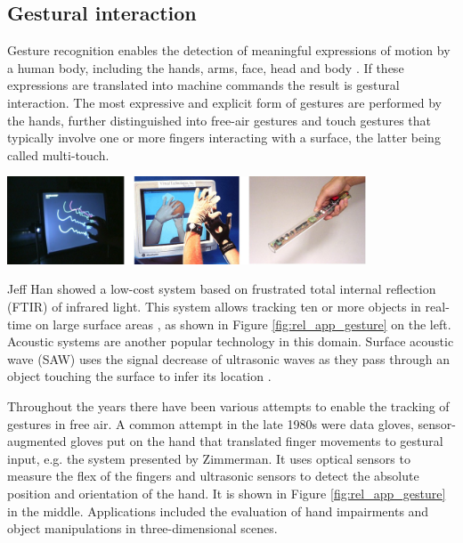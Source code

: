 \subsection{Gestural interaction}
Gesture recognition enables the detection of meaningful expressions of motion by a human body, including the hands, arms, face, head and body \cite{mitra2007gesture}	. If these expressions are translated into machine commands the result is gestural interaction. The most expressive and explicit form of gestures are performed by the hands, further distinguished into free-air gestures and touch gestures that typically involve one or more fingers interacting with a surface, the latter being called multi-touch.

\begin{minipage}{\linewidth}
\centering
\includegraphics[width=0.8\textwidth]{images/rel_app_gesture}
\label{fig:rel_app_gesture}
\end{minipage}

Jeff Han showed a low-cost system based on frustrated total internal reflection (FTIR) of infrared light. This system allows tracking ten or more objects in real-time on large surface areas \cite{Han2005}, as shown in Figure \ref{fig:rel_app_gesture} on the left. Acoustic systems are another popular technology in this domain. Surface acoustic wave (SAW) uses the signal decrease of ultrasonic waves as they pass through an object touching the surface to infer its location \cite{Armstrong1998}.
  
Throughout the years there have been various attempts to enable the tracking of gestures in free air. A common attempt in the late 1980s were data gloves, sensor-augmented gloves put on the hand that translated finger movements to gestural input, e.g. the system presented by Zimmerman\cite{zimmerman1987hand}. It uses optical sensors to measure the flex of the fingers and ultrasonic sensors to detect the absolute position and orientation of the hand. It is shown in Figure \ref{fig:rel_app_gesture} in the middle. Applications included the evaluation of hand impairments and object manipulations in three-dimensional scenes.

